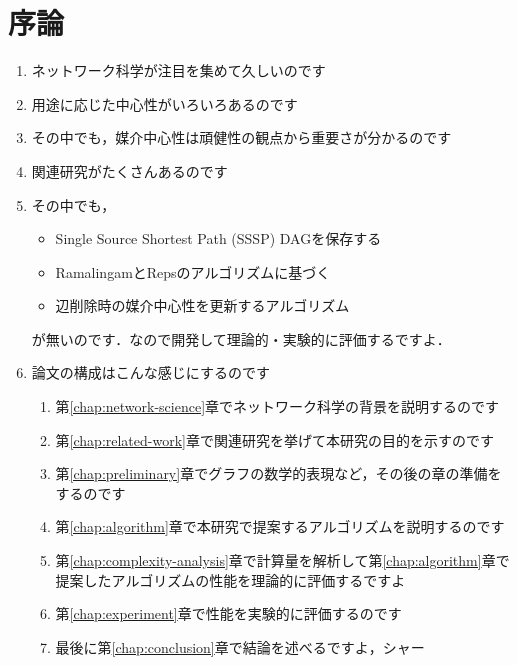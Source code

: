 \chapter{序論}
\label{chap:introduction}

\begin{enumerate}
  \item ネットワーク科学が注目を集めて久しいのです
\item 用途に応じた中心性がいろいろあるのです
\item その中でも，媒介中心性は頑健性の観点から重要さが分かるのです
\item 関連研究がたくさんあるのです
\item その中でも，
  \begin{itemize}
  \item Single Source Shortest Path (SSSP) DAGを保存する
  \item RamalingamとRepsのアルゴリズムに基づく
  \item 辺削除時の媒介中心性を更新するアルゴリズム
  \end{itemize}
  \par が無いのです．なので開発して理論的・実験的に評価するですよ．
\item 論文の構成はこんな感じにするのです
  \begin{enumerate}
  \item 第\ref{chap:network-science}章でネットワーク科学の背景を説明するのです
  \item 第\ref{chap:related-work}章で関連研究を挙げて本研究の目的を示すのです
  \item 第\ref{chap:preliminary}章でグラフの数学的表現など，その後の章の準備をするのです
  \item 第\ref{chap:algorithm}章で本研究で提案するアルゴリズムを説明するのです
  \item 第\ref{chap:complexity-analysis}章で計算量を解析して第\ref{chap:algorithm}章で提案したアルゴリズムの性能を理論的に評価するですよ
  \item 第\ref{chap:experiment}章で性能を実験的に評価するのです
  \item 最後に第\ref{chap:conclusion}章で結論を述べるですよ，シャー
  \end{enumerate}
\end{enumerate}

